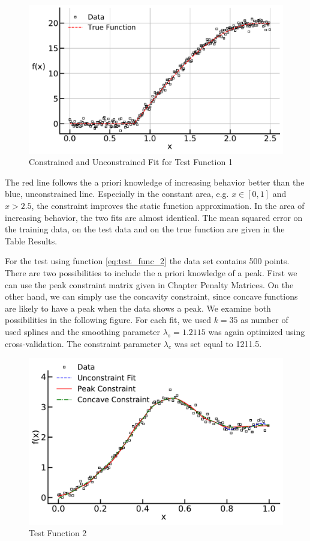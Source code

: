 \documentclass[10pt,a4paper]{article}
\begin{document}
\begin{figure}[H]
	\centering
	\includegraphics[width=\columnwidth]{../thesisplots/exp_inc1.pdf}
	\caption{Constrained and Unconstrained Fit for Test Function 1}
	\label{fig:fit_test_func_1}
\end{figure}

The red line follows the a priori knowledge of increasing behavior better than the blue, unconstrained line. Especially in the constant area, e.g. $x \in  [0, 1]$ and $x > 2.5$, the constraint improves the static function approximation. In the area of increasing behavior, the two fits are almost identical. The mean squared error on the training data, on the test data and on the true function are given in the Table Results.

For the test using function \ref{eq:test_func_2} the data set contains 500 points. There are two possibilities to include the a priori knowledge of a peak. First we can use the peak constraint matrix given in Chapter Penalty Matrices. On the other hand, we can simply use the concavity constraint, since concave functions are likely to have a peak when the data shows a peak. We examine both possibilities in the following figure. For each fit, we used $k=35$ as number of used splines and the smoothing parameter $\lambda_s = 1.2115$ was again optimized using cross-validation. The constraint parameter $\lambda_c$ was set equal to 1211.5.

\begin{figure}[H]
	\centering
	\includegraphics[width=\columnwidth]{../thesisplots/exp_peak1.pdf}
	\caption{Test Function 2}
	\label{fig:fit_test_func_2}
\end{figure}
 
\end{document}
